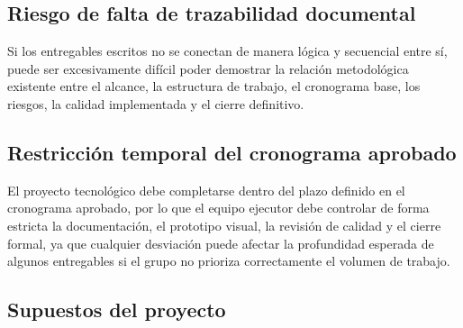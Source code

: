 \documentclass[11pt,spanish]{article}
\begin{document}
\subsection{Riesgo de falta de trazabilidad documental}

Si los entregables escritos no se conectan de manera lógica y secuencial entre sí, puede ser excesivamente difícil poder demostrar la relación metodológica existente entre el alcance, la estructura de trabajo, el cronograma base, los riesgos, la calidad implementada y el cierre definitivo.

\subsection{Restricción temporal del cronograma aprobado}

El proyecto tecnológico debe completarse dentro del plazo definido en el cronograma aprobado, por lo que el equipo ejecutor debe controlar de forma estricta la documentación, el prototipo visual, la revisión de calidad y el cierre formal, ya que cualquier desviación puede afectar la profundidad esperada de algunos entregables si el grupo no prioriza correctamente el volumen de trabajo.

\subsection{Supuestos del proyecto}
\end{document}

